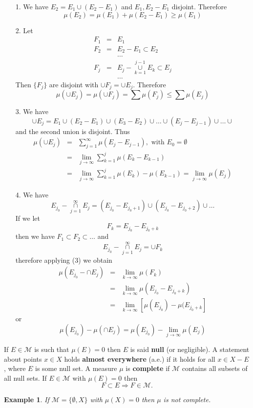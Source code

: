 \documentclass[12pt]{report}
\newtheorem{example}[theorem]{Example}
\begin{document}
\vspace{.15cm}
\begin{itemize}
\item[1.]  We have $E_2 = E_1 \cup (E_2 - E_1)$ and $E_1, E_2 - E_1$
disjoint.  Therefore
\[
\mu(E_2) = \mu(E_1) + \mu(E_2 - E_1) \ge \mu (E_1)
\]
\item[2.]  Let
\begin{eqnarray*} F_1 &=& E_1\\ F_2 &=& E_2 - E_1 \subset E_2\\ &\
&\dots\\ F_j &=& E_j - \overset{j-1}{\underset{k=1}{\cup}}  E_k \subset
E_j\\ &\ &\dots
\end{eqnarray*} Then $\{F_j\}$ are disjoint with $\cup F_j = \cup E_j$.
Therefore
\[
\mu(\cup E_j) = \mu(\cup F_j) = \sum \mu (F_j) \le \sum \mu (E_j)
\]
\item[3.]  We have
\[
\cup E_j = E_1 \cup (E_2 - E_1) \cup (E_3 - E_2) \cup \dots
\cup (E_j - E_{j-1}) \cup \dots \cup
\] and the second union is disjoint.  Thus
\begin{eqnarray*}
\mu(\cup E_j) &=& \sum^\infty_{j=1} \mu(E_j - E_{j-1}),
\mbox{ with } E_0 = \emptyset\\ &=& \lim_{j \to \infty} \sum^j_{k=1}
\mu(E_k - E_{k-1})\\ &=& \lim_{j \to \infty} \sum^j_{k=1} \mu (E_k) -
\mu(E_{k-1}) = \lim_{j \to \infty} \mu(E_j)
\end{eqnarray*}
\item[4.]  We have \[ E_{j_0} - \overset{\infty}{\underset{j=1}{\cap}}  E_j =
\left (E_{j_0} - E_{j_0 + 1}
\right ) \cup \left ( E_{j_0} - E_{j_0 + 2}\right ) \cup \dots
\] If we let
\[ F_k = E_{j_0} - E_{j_0 + k}
\] then we have $F_1 \subset F_2 \subset \dots$ and
\[ E_{j_0} - \overset{\infty}{\underset{j=1}{\cap}}  E_j = \cup F_k
\] therefore applying (3) we obtain
\begin{eqnarray*}
\mu(E_{j_0} - \cap E_j) &=& \lim_{k \to \infty} \mu(F_k)\\ &=& \lim_{k
\to \infty} \mu (E_{j_0} - E_{j_0 + k})\\ &=& \lim_{k \to \infty}
[\mu(E_{j_0}) - \mu(E_{j_0 + k}]\end{eqnarray*} or
\[\mu(E_{j_0}) - \mu(\cap E_j) = \mu(E_{j_0}) - \lim_{j \to
\infty} \mu(E_j)
\]
\end{itemize}

If $E \in \mathcal{M}$ is such that $\mu(E) = 0$ then $E$ is said {\bf
null} (or negligible).  A statement about points $x \in X$ holds {\bf 
almost everywhere} (a.e.) if it holds for all $x \in X - E$, where $E$ is some
null set.  A measure $\mu$ is {\bf complete} if $\mathcal{M}$ contains
all subsets of all null sets.  If $E \in \mathcal{M}$ with $\mu(E) = 0$ then
\[ F \subset E \Longrightarrow F \in \mathcal{M}.
\]
\begin{example}  If $\mathcal{M} = \{\emptyset, X\}$ with
$\mu(X) = 0$ then
$\mu$ is not complete.
\end{example}
\end{document}
